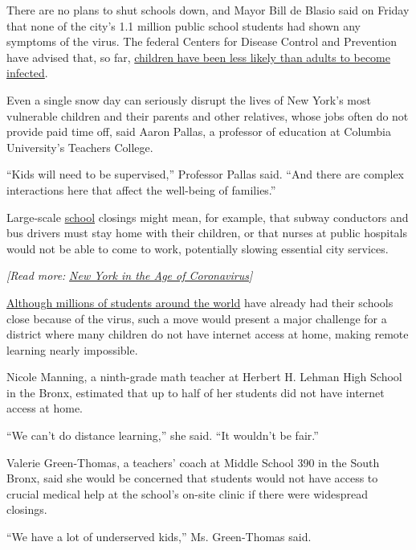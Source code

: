 There are no plans to shut schools down, and Mayor Bill de Blasio said
on Friday that none of the city's 1.1 million public school students had
shown any symptoms of the virus. The federal Centers for Disease Control
and Prevention have advised that, so far,
\href{https://www.cdc.gov/coronavirus/2019-ncov/specific-groups/children-faq.html}{children
have been less likely than adults to become infected}.

Even a single snow day can seriously disrupt the lives of New York's
most vulnerable children and their parents and other relatives, whose
jobs often do not provide paid time off, said Aaron Pallas, a professor
of education at Columbia University's Teachers College.

``Kids will need to be supervised,'' Professor Pallas said. ``And there
are complex interactions here that affect the well-being of families.''

Large-scale
\href{https://www.nytimes3xbfgragh.onion/2020/04/16/nyregion/special-education-coronavirus-nyc.html}{school}
closings might mean, for example, that subway conductors and bus drivers
must stay home with their children, or that nurses at public hospitals
would not be able to come to work, potentially slowing essential city
services.

\emph{{[}Read more:}
\href{https://www.nytimes3xbfgragh.onion/2020/03/08/nyregion/coronavirus-nyc.html}{\emph{New
York in the Age of Coronavirus}}\emph{{]}}

\href{https://www.nytimes3xbfgragh.onion/2020/03/04/world/coronavirus-schools-closed.html}{Although
millions of students around the world} have already had their schools
close because of the virus, such a move would present a major challenge
for a district where many children do not have internet access at home,
making remote learning nearly impossible.

Nicole Manning, a ninth-grade math teacher at Herbert H. Lehman High
School in the Bronx, estimated that up to half of her students did not
have internet access at home.

``We can't do distance learning,'' she said. ``It wouldn't be fair.''

Valerie Green-Thomas, a teachers' coach at Middle School 390 in the
South Bronx, said she would be concerned that students would not have
access to crucial medical help at the school's on-site clinic if there
were widespread closings.

``We have a lot of underserved kids,'' Ms. Green-Thomas said.

